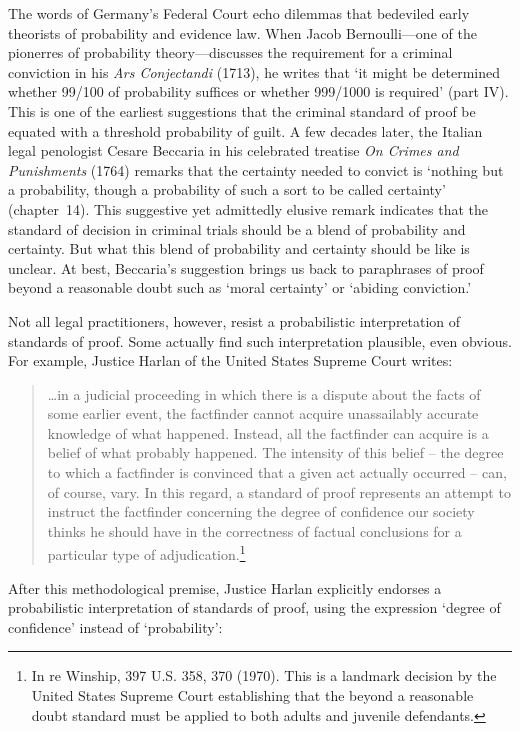 \documentclass[
  10pt,
  dvipsnames,enabledeprecatedfontcommands]{scrartcl}
\begin{document}
The words of Germany's Federal Court echo dilemmas that bedeviled early
theorists of probability and evidence law. When Jacob Bernoulli---one of
the pionerres of probability theory---discusses the requirement for a
criminal conviction in his \textit{Ars Conjectandi} (1713), he writes
that `it might be determined whether 99/100 of probability suffices or
whether 999/1000 is required' (part IV). This is one of the earliest
suggestions that the criminal standard of proof be equated with a
threshold probability of guilt. A few decades later, the Italian legal
penologist Cesare Beccaria in his celebrated treatise
\textit{On Crimes and Punishments} (1764) remarks that the certainty
needed to convict is `nothing but a probability, though a probability of
such a sort to be called certainty' (chapter~14). This suggestive yet
admittedly elusive remark indicates that the standard of decision in
criminal trials should be a blend of probability and certainty. But what
this blend of probability and certainty should be like is unclear. At
best, Beccaria's suggestion brings us back to paraphrases of proof
beyond a reasonable doubt such as `moral certainty' or `abiding
conviction.'

Not all legal practitioners, however, resist a probabilistic
interpretation of standards of proof. Some actually find such
interpretation plausible, even obvious. For example, Justice Harlan of
the United States Supreme Court writes:

\begin{quote}
\dots in a judicial proceeding in which there is a dispute about the facts of some earlier event, the factfinder cannot acquire unassailably accurate knowledge of what happened. Instead, all the factfinder can acquire is a belief of what probably happened. The intensity of this belief -- the degree to which a factfinder is convinced that a given act actually occurred -- can, of course, vary. In this regard, a standard of proof represents an attempt to instruct the factfinder concerning the degree of confidence our society thinks he should have in the correctness of factual conclusions for a particular type of adjudication.\footnote{In re Winship, 397 U.S. 358, 370 (1970). This is a landmark decision by the United States Supreme Court establishing  that the beyond a reasonable doubt standard must be applied to both adults and juvenile defendants.}
\end{quote}

\noindent After this methodological premise, Justice Harlan explicitly
endorses a probabilistic interpretation of standards of proof, using the
expression `degree of confidence' instead of `probability':
\end{document}
